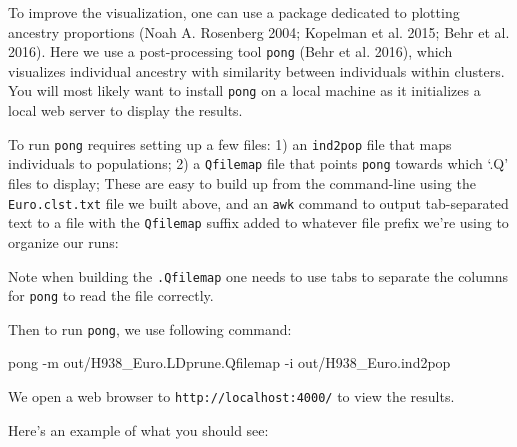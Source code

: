 \documentclass[smallextended]{svjour3}       %
\newenvironment{Shaded}{\begin{snugshade}}{\end{snugshade}}
\newcommand{\StringTok}[1]{\textcolor[rgb]{0.31,0.60,0.02}{#1}}
\newcommand{\FunctionTok}[1]{\textcolor[rgb]{0.00,0.00,0.00}{#1}}
\newcommand{\VariableTok}[1]{\textcolor[rgb]{0.00,0.00,0.00}{#1}}
\newcommand{\OperatorTok}[1]{\textcolor[rgb]{0.81,0.36,0.00}{\textbf{#1}}}
\newcommand{\ExtensionTok}[1]{#1}
\newcommand{\NormalTok}[1]{#1}
\begin{document}
To improve the visualization, one can use a package dedicated to
plotting ancestry proportions (Noah A. Rosenberg 2004; Kopelman et al.
2015; Behr et al. 2016). Here we use a post-processing tool
\texttt{pong} (Behr et al. 2016), which visualizes individual ancestry
with similarity between individuals within clusters. You will most
likely want to install \texttt{pong} on a local machine as it
initializes a local web server to display the results.

To run \texttt{pong} requires setting up a few files: 1) an
\texttt{ind2pop} file that maps individuals to populations; 2) a
\texttt{Qfilemap} file that points \texttt{pong} towards which `.Q'
files to display; These are easy to build up from the command-line using
the \texttt{Euro.clst.txt} file we built above, and an \texttt{awk}
command to output tab-separated text to a file with the
\texttt{Qfilemap} suffix added to whatever file prefix we're using to
organize our runs:

\begin{Shaded}
\end{Shaded}

Note when building the \texttt{.Qfilemap} one needs to use tabs to
separate the columns for \texttt{pong} to read the file correctly.

Then to run \texttt{pong}, we use following command:

\begin{Shaded}
\begin{Highlighting}[]
\ExtensionTok{pong}\NormalTok{ -m out/H938_Euro.LDprune.Qfilemap -i out/H938_Euro.ind2pop}
\end{Highlighting}
\end{Shaded}

We open a web browser to \texttt{http://localhost:4000/} to view the
results.

Here's an example of what you should see:
\end{document}
